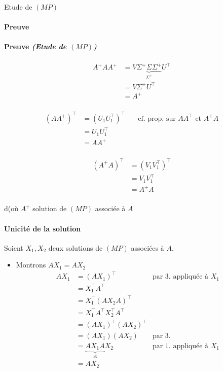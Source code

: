 \documentclass{article}
\newenvironment{proof}[1][\unskip]{
	\def\temp{#1}\ifx\temp\empty
		\paragraph{Preuve}
	\else
		\paragraph{Preuve \emph{(#1)}}
	\fi

}{}
\begin{document}
\begin{proof}[Etude de $(MP)$]
    \item \begin{align*}
        A^+ A A^+ &= V \underbrace{\Sigma^+ \Sigma \Sigma^+}_{\Sigma^+} U^\top \\
        &= V \Sigma^+ U^\top \\
        &= A^+ \\
    \end{align*}

    \item \begin{align*}
            (A A^+)^\top &= (U_1 U_1^\top)^\top \quad&\text{cf. prop. sur $A A^\top$ et $A^+ A$} \\
            &= U_1 U_1^\top \\
            &= A A^+ \\
    \end{align*}

    \item \begin{align*}
            (A^+ A)^\top &= (V_1 V_1^\top)^\top \\
            &= V_1 V_1^\top \\
            &= A^+ A \\
    \end{align*}

    d(où $A^+$ solution de $(MP)$ associée à $A$ 

\paragraph{Unicité de la solution}
Soient $X_1, X_2$ deux solutions de $(MP)$ associées à $A$.

\begin{itemize}
    \item Montrons $AX_1 = AX_2$ 
        \begin{align*}
            AX_1 &= (AX_1)^\top \quad&\text{par 3. appliquée à $X_1$} \\
            &= X_1^\top A^\top \\
            &= X_1^\top (AX_2 A )^\top \\
            &= X_1^\top A^\top X_2^\top A^\top \\
            &= (A X_1)^\top (AX_2)^\top \\
            &= (AX_1) (AX_2) \quad&\text{par 3.} \\
            &= \underbrace{AX_1 A}_{A} X_2 \quad&\text{par 1. appliquée à $X_1$}\\
            &= AX_2 \\
        \end{align*}


\end{itemize}
\end{proof}
\end{document}
